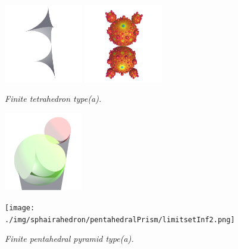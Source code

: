 \documentclass[suppldata, dvipdfmx]{interact}
\theoremstyle{plain}%
\theoremstyle{definition}
\theoremstyle{remark}
\theoremstyle{problemstyle}
\begin{document}
\begin{figure}[h!tbp]
 \begin{minipage}{0.5\textwidth}
  \begin{minipage}[t]{0.24\textwidth}
   \centering
   \includegraphics[width=1.35in, height=1.35in, keepaspectratio]{./img/sphairahedron/pentahedralPrism/sphairahedronFinite2.png}
  \end{minipage}
  \hspace*{\fill}
  \begin{minipage}[t]{0.24\textwidth}
   \centering
   \includegraphics[width=1.35in, height=1.35in, keepaspectratio]{./img/sphairahedron/pentahedralPrism/limitsetFinite2.png}
  \end{minipage}
  \hspace*{\fill}
  \caption{\textit{Finite tetrahedron type(a).}}
  \label{fig:pentahedralPrismFinite}
 \end{minipage}
 \hspace*{\fill}
 \begin{minipage}{0.5\textwidth}
  \begin{minipage}[t]{0.24\textwidth}
   \centering
   \includegraphics[width=1.35in, height=1.35in, keepaspectratio]{./img/sphairahedron/pentahedralPrism/sphairahedronInf2.png}
  \end{minipage}
  \hspace*{\fill}
  \begin{minipage}[t]{0.24\textwidth}
   \centering
   \texttt{[image: ./img/sphairahedron/pentahedralPrism/limitsetInf2.png]}
   \label{fig:pentahedralPrismInfNegLimit}
  \end{minipage}
  \hspace*{\fill}
  \caption{\textit{Finite pentahedral pyramid type(a).}}
  \label{fig:pentahedralPrismInfNeg}
 \end{minipage}
\end{figure}
\end{document}
